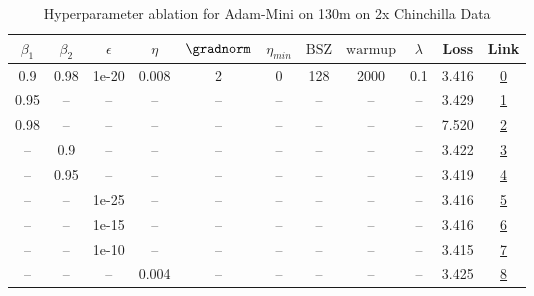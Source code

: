 \begin{table}[H]
\centering
\caption{Hyperparameter ablation for Adam-Mini on 130m on 2x Chinchilla Data}
\label{tab:ablation_adam-mini_130m_on_2x_chinchilla_data}
\begin{tabular}{ccccccccccc}
\toprule
$\beta_1$ & $\beta_2$ & $\epsilon$ & $\eta$ & $\gradnorm$ & $\eta_{min}$ & $\mathrm{BSZ}$ & $\mathrm{warmup}$ & $\lambda$ & Loss & Link \\
\midrule
0.9 & 0.98 & 1e-20 & 0.008 & 2 & 0 & 128 & 2000 & 0.1 & 3.416 & \href{https://wandb.ai/stanford-mercury/optimizer-scaling/runs/sweep-130m-5B-mini609ad2lr0.008-wd0.1-minlr0-warmup2000-b10.9-b2-b557c0}{0} \\
\midrule
0.95 & -- & -- & -- & -- & -- & -- & -- & -- & 3.429 & \href{https://wandb.ai/stanford-mercury/optimizer-scaling/runs/sweep-130m-5B-mini20b8b1lr0.008-wd0.1-minlr0-warmup2000-b10.95-b-b46cb8}{1} \\
0.98 & -- & -- & -- & -- & -- & -- & -- & -- & 7.520 & \href{https://wandb.ai/stanford-mercury/optimizer-scaling/runs/sweep-130m-5B-minideec58lr0.008-wd0.1-minlr0-warmup2000-b10.98-b-62bc48}{2} \\
-- & 0.9 & -- & -- & -- & -- & -- & -- & -- & 3.422 & \href{https://wandb.ai/stanford-mercury/optimizer-scaling/runs/sweep-130m-5B-minib27e6blr0.008-wd0.1-minlr0-warmup2000-b10.9-b2-04f0b5}{3} \\
-- & 0.95 & -- & -- & -- & -- & -- & -- & -- & 3.419 & \href{https://wandb.ai/stanford-mercury/optimizer-scaling/runs/sweep-130m-5B-mini51a865lr0.008-wd0.1-minlr0-warmup2000-b10.9-b2-856cfa}{4} \\
-- & -- & 1e-25 & -- & -- & -- & -- & -- & -- & 3.416 & \href{https://wandb.ai/stanford-mercury/optimizer-scaling/runs/sweep-130m-5B-mini7d5c8flr0.008-wd0.1-minlr0-warmup2000-b10.9-b2-dd8629}{5} \\
-- & -- & 1e-15 & -- & -- & -- & -- & -- & -- & 3.416 & \href{https://wandb.ai/stanford-mercury/optimizer-scaling/runs/sweep-130m-5B-mini8f577dlr0.008-wd0.1-minlr0-warmup2000-b10.9-b2-361bf6}{6} \\
-- & -- & 1e-10 & -- & -- & -- & -- & -- & -- & 3.415 & \href{https://wandb.ai/stanford-mercury/optimizer-scaling/runs/sweep-130m-5B-minidbb1e7lr0.008-wd0.1-minlr0-warmup2000-b10.9-b2-9d6767}{7} \\
-- & -- & -- & 0.004 & -- & -- & -- & -- & -- & 3.425 & \href{https://wandb.ai/stanford-mercury/optimizer-scaling/runs/sweep-130m-5B-miniab7841lr0.004-wd0.1-minlr0-warmup2000-b10.9-b2-0d5f4f}{8} \\

\end{tabular}
\end{table}
